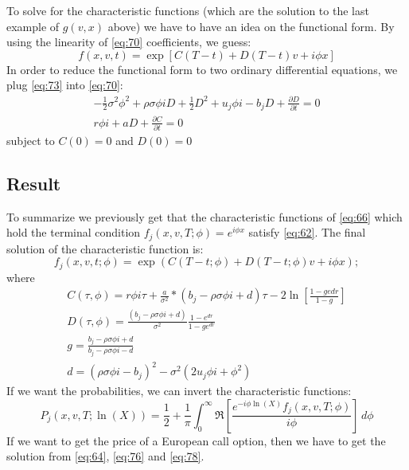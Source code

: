 \documentclass{article}
\begin{document}
To solve for the characteristic functions (which are the solution to the last example of $g(v, x)$ above) we have to have an idea on the functional form. By using the linearity of \ref{eq:70} coefficients, we guess:
\begin{equation} \label{eq:73}
    f(x, v, t) = \exp[C (T - t) + D (T - t) v + i\phi x]
\end{equation}
In order to reduce the functional form to two ordinary differential equations, we plug \ref{eq:73} into \ref{eq:70}:
\begin{gather}
    -\frac{1}{2}  \sigma^{2} \phi^{2} + \rho \sigma \phi i D + \frac{1}{2} D^{2} + u_{j} \phi i - b_{j} D + \frac{\partial D}{\partial t} = 0 \\
    r \phi i + a D + \frac{\partial C}{\partial t} = 0
\end{gather}
subject to $C(0) = 0$ and $D(0) = 0$
\subsection{Result}
To summarize we previously get that the characteristic functions of \ref{eq:66} which hold the terminal condition $f_{j}(x, v, T; \phi) = e^{i \phi x}$ satisfy \ref{eq:62}. The final solution of the characteristic function is:
\begin{equation}\label{eq:76}
    f_{j}(x, v, t; \phi) = \exp(C(T - t; \phi) + D(T - t; \phi) v + i \phi x);
\end{equation}
where 
\begin{equation}
    \begin{gathered}
    C(\tau, \phi) = r \phi i \tau + \frac{a}{\sigma^{2}} * {(b_{j} - \rho \sigma \phi i + d) \tau - 2 \ln\left[\frac{1 - g ed r}{1 - g}\right]} \\
    D(\tau,\phi) = \frac{(b_{j} - \rho \sigma \phi i + d)} {\sigma^{2}} \frac{1 - e^{d r}} {1 - g e^{d r}} \\
    g = \frac{b_{j} - \rho \sigma \phi i + d}{b_{j} - \rho \sigma \phi i - d} \\
    d = (\rho \sigma \phi i - b_{j})^{2} - \sigma^{2} (2 u_{j} \phi i + \phi^{2})
    \end{gathered}
\end{equation}
If we want the probabilities, we can invert the characteristic functions:
\begin{equation}\label{eq:78}
     P_{j}(x, v, T; \ln(X)) = \frac{1}{2} + \frac{1}{\pi} \int_{0}^{\infty} \Re\left[\frac{e^{-i \phi \ln(X)} f_{j}(x, v, T; \phi)}{i \phi}\right] \, d\phi
\end{equation}
If we want to get the price of a European call option, then we have to get the solution from \ref{eq:64}, \ref{eq:76} and \ref{eq:78}.
\end{document}
